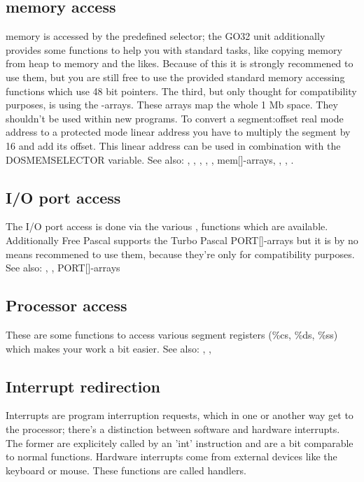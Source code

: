 \subsection{\dos memory access}
\dos memory is accessed by the predefined  selector; 
the GO32 unit additionally provides some functions to help you with standard tasks,
like copying memory from heap to \dos memory and the likes. Because of this
it is strongly recommened to use them, but you are still free to use the
provided standard memory accessing functions which use 48 bit pointers. The
third, but only thought for compatibility purposes, is using the
-arrays. These arrays map the whole 1 Mb \dos space. They shouldn't be
used within new programs.
To convert a segment:offset real mode address to a protected mode linear
address you have to multiply the segment by 16 and add its offset. This
linear address can be used in combination with the DOSMEMSELECTOR variable.
See also: 
,
,
,
,
,
mem[]-arrays, 
,
,
. 
\subsection{I/O port access}
The I/O port access is done via the various , 
functions
which are available. Additionally Free Pascal supports the Turbo Pascal
PORT[]-arrays but it is by no means recommened to use them, because they're
only for compatibility purposes.
See also: , , PORT[]-arrays
\subsection{Processor access}
These are some functions to access various segment registers (\%cs, \%ds, \%ss)
which makes your work a bit easier.
See also: , , 
\subsection{Interrupt redirection}
Interrupts are program interruption requests, which in one or another way
get to the processor; there's a distinction between software and hardware
interrupts. The former are explicitely called by an 'int' instruction and
are a bit comparable to normal functions. Hardware interrupts come from
external devices like the keyboard or mouse. These functions are called
handlers.
